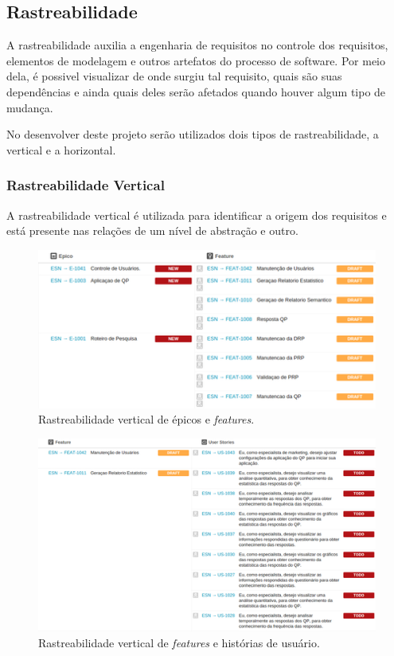 	\subsection{Rastreabilidade}

	A rastreabilidade auxilia a engenharia de requisitos no controle dos requisitos, elementos de modelagem e outros artefatos do processo de software. Por meio dela, é possivel visualizar de onde surgiu tal requisito, quais são suas dependências e ainda quais deles serão afetados quando houver algum tipo de mudança.

	No desenvolver deste projeto serão utilizados dois tipos de rastreabilidade, a vertical e a horizontal.
	
	\subsubsection{Rastreabilidade Vertical}
	A rastreabilidade vertical é utilizada para identificar a origem dos requisitos e está presente nas relações de um nível de abstração e outro.\\

		\begin{figure}[!htp]
			\centering
			\includegraphics{imagens/epicfeat.png}
			\caption{Rastreabilidade vertical de épicos e \textit{features}.}
			\label{imagem}
		\end{figure}

		\begin{figure}[!htp]
			\centering
			\includegraphics{imagens/featus.png}
			\caption{Rastreabilidade vertical de \textit{features} e histórias de usuário.}
			\label{imagem}
		\end{figure}

